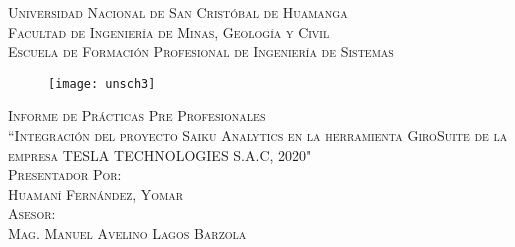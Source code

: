\newcommand{\mydate}{\formatdate{02}{12}{2020}}
\begin{titlepage}
	\begin{center}
		\textsc{ 
		\Large Universidad Nacional de San Cristóbal de Huamanga\\
		\vspace{5mm}
			Facultad de Ingeniería de Minas, Geología y Civil\\
		\vspace{5mm}
		Escuela de Formación Profesional de Ingeniería de Sistemas\\}
	
			\begin{figure}[h]
				\centering
				\texttt{[image: unsch3]}
			\end{figure}
		
		\textsc{ 
			\large Informe de Prácticas Pre Profesionales\\
			\vspace{5mm}
				``Integración del proyecto Saiku Analytics en la herramienta GiroSuite de la empresa TESLA TECHNOLOGIES S.A.C, 2020"\\
			\vspace{1cm}
			Presentador Por:\\
			Huamaní Fernández, Yomar\\	
			\vspace{5mm}
			Asesor:\\
			Mag. Manuel Avelino Lagos Barzola\\
			\vspace{5mm}
			\mydate
		}
	\end{center}
\end{titlepage}